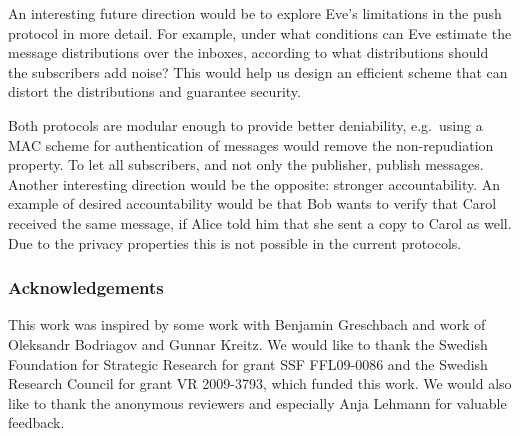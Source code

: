 
An interesting future direction would be to explore Eve's limitations in the 
push protocol in more detail.
For example, under what conditions can Eve estimate the message distributions 
over the inboxes, according to what distributions should the subscribers add 
noise?
This would help us design an efficient scheme that can distort the 
distributions and guarantee security.

Both protocols are modular enough to provide better deniability, e.g.\ using 
a \ac{MAC} scheme for authentication of messages would remove the 
non-repudiation property.
To let all subscribers, and not only the publisher, publish messages.
Another interesting direction would be the opposite: stronger accountability.
An example of desired accountability would be that Bob wants to verify that 
Carol received the same message, if Alice told him that she sent a copy to 
Carol as well.
Due to the privacy properties this is not possible in the current protocols.


\subsubsection{Acknowledgements}

This work was inspired by some work with Benjamin Greschbach and work of 
Oleksandr Bodriagov and Gunnar Kreitz.
We would like to thank the Swedish Foundation for Strategic Research for grant 
SSF FFL09-0086 and the Swedish Research Council for grant VR 2009-3793, which 
funded this work.
We would also like to thank the anonymous reviewers and especially Anja Lehmann 
for valuable feedback.


\printbibliography{}

